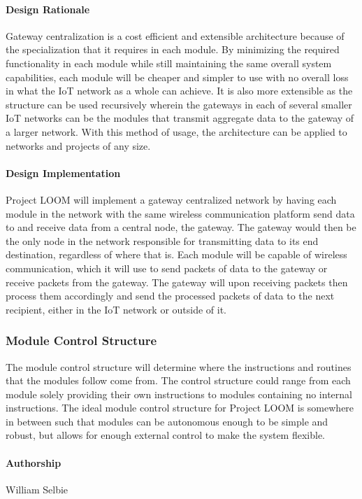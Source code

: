 \documentclass[onecolumn, draftclsnofoot,10pt, compsoc]{IEEEtran}
\begin{document}
\paragraph{Design Rationale}
Gateway centralization is a cost efficient and extensible architecture because of the specialization that it requires in each module. By minimizing the required functionality in each module while still maintaining the same overall system capabilities, each module will be cheaper and simpler to use with no overall loss in what the IoT network as a whole can achieve. It is also more extensible as the structure can be used recursively wherein the gateways in each of several smaller IoT networks can be the modules that transmit aggregate data to the gateway of a larger network. With this method of usage, the architecture can be applied to networks and projects of any size.

\paragraph{Design Implementation}
Project LOOM will implement a gateway centralized network by having each module in the network with the same wireless communication platform send data to and receive data from a central node, the gateway. The gateway would then be the only node in the network responsible for transmitting data to its end destination, regardless of where that is. Each module will be capable of wireless communication, which it will use to send packets of data to the gateway or receive packets from the gateway. The gateway will upon receiving packets then process them accordingly and send the processed packets of data to the next recipient, either in the IoT network or outside of it. 

\subsubsection{Module Control Structure}
The module control structure will determine where the instructions and routines that the modules follow come from. The control structure could range from each module solely providing their own instructions to modules containing no internal instructions. The ideal module control structure for Project LOOM is somewhere in between such that modules can be autonomous enough to be simple and robust, but allows for enough external control to make the system flexible.

\paragraph{Authorship}
William Selbie
\end{document}
